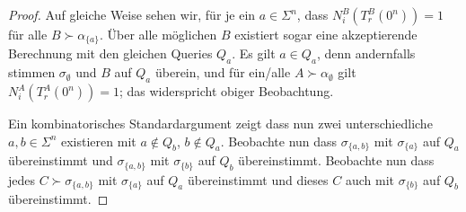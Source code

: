 \documentclass[nofonts]{uebung}
\begin{document}
\begin{proof}
    Auf gleiche Weise sehen wir, für je ein $a\in\Sigma^n$, dass $N^B_i(T_r^B(0^n))=1$ für alle $B\succ\alpha_{\{a\}}$.
    Über alle möglichen $B$ existiert sogar eine akzeptierende Berechnung mit den gleichen Queries $Q_a$.
    Es gilt $a\in Q_a$, denn andernfalls stimmen $\sigma_\emptyset$ und $B$ auf $Q_a$ überein, und für ein/alle $A\succ\alpha_\emptyset$ gilt $N^A_i(T_r^A(0^n))=1$; das widerspricht obiger Beobachtung.

    Ein kombinatorisches Standardargument zeigt dass nun zwei unterschiedliche $a,b\in \Sigma^n$ existieren mit $a\not\in Q_b$, $b\not\in Q_a$.
    Beobachte nun dass $\sigma_{\{a,b\}}$ mit $\sigma_{\{a\}}$ auf $Q_a$ übereinstimmt und $\sigma_{\{a,b\}}$ mit $\sigma_{\{b\}}$ auf $Q_b$ übereinstimmt.
    Beobachte nun dass jedes $C\succ\sigma_{\{a,b\}}$ mit $\sigma_{\{a\}}$ auf $Q_a$ übereinstimmt und dieses $C$ auch mit $\sigma_{\{b\}}$ auf $Q_b$ übereinstimmt.
\end{proof}
\end{document}
